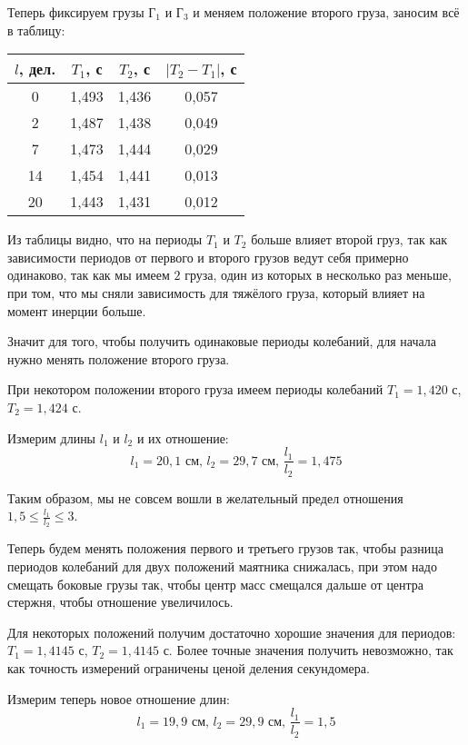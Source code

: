 \documentclass[a4paper, 12pt]{article} %
\begin{document}
Теперь фиксируем грузы $\text{Г}_1$ и $\text{Г}_3$ и меняем положение второго груза, заносим всё в таблицу:

\begin{center}
\begin{tabular}{|c|c|c|c|}
\hline 
$l$, дел. & $T_1$, с & $T_2$, с & $|T_2 - T_1|$, с \\ 
\hline 
0 & 1,493 & 1,436 & 0,057 \\ 
\hline 
2 & 1,487 & 1,438 & 0,049 \\ 
\hline 
7 & 1,473 & 1,444 & 0,029 \\ 
\hline 
14 & 1,454 & 1,441 & 0,013 \\ 
\hline 
20 & 1,443 & 1,431 & 0,012 \\ 
\hline 

\end{tabular}
\end{center} 

Из таблицы видно, что на периоды $T_1$ и $T_2$ больше влияет второй груз, так как зависимости периодов от первого и второго грузов ведут себя примерно одинаково, так как мы имеем $2$ груза, один из которых в несколько раз меньше, при том, что мы сняли зависимость для тяжёлого груза, который влияет на момент инерции больше. 

Значит для того, чтобы получить одинаковые периоды колебаний, для начала нужно менять положение второго груза.

При некотором положении второго груза имеем периоды колебаний $T_1 = 1,420$ с, $T_2 = 1,424$ с.

Измерим длины $l_1$ и  $l_2$ и их отношение:
\[l_1 = 20,1 \text{ см, } l_2 = 29,7\text{ см, } \frac{l_1}{l_2} = 1,475\]

Таким образом, мы не совсем вошли в желательный предел отношения $1,5 \leqslant \frac{l_1}{l_2} \leqslant 3$. 

Теперь будем менять положения первого и третьего грузов так, чтобы разница периодов колебаний для двух положений маятника снижалась, при этом надо смещать боковые грузы так, чтобы центр масс смещался дальше от центра стержня, чтобы отношение увеличилось.

 Для некоторых положений получим достаточно хорошие значения для периодов: $T_1 = 1,4145$ с, $T_2 = 1,4145$ с. Более точные значения получить невозможно, так как точность измерений ограничены ценой деления секундомера.

Измерим теперь новое отношение длин:
\[l_1 = 19,9 \text{ см, } l_2 = 29,9\text{ см, } \frac{l_1}{l_2} = 1,5\]
\end{document}
